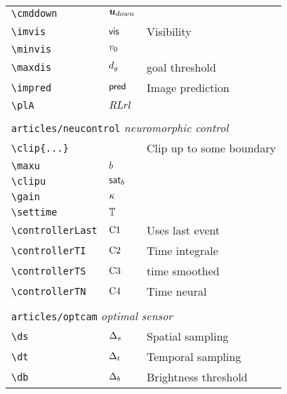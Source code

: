\begin{longtable}{lll}
 {\color[rgb]{0.5,0.5,0.5}\texttt{\textbackslash cmddown}} & $\boldsymbol{u}_{down}$ & \\ 
 {\color[rgb]{0.5,0.5,0.5}\texttt{\textbackslash imvis}} & $\mathsf{vis}$ &  Visibility\\ 
 {\color[rgb]{0.5,0.5,0.5}\texttt{\textbackslash minvis}} & $v_0$ & \\ 
 {\color[rgb]{0.5,0.5,0.5}\texttt{\textbackslash maxdis}} & $d_g$ &  goal threshold\\ 
 {\color[rgb]{0.5,0.5,0.5}\texttt{\textbackslash impred}} & $\mathsf{pred}$ &  Image prediction\\ 
 {\color[rgb]{0.5,0.5,0.5}\texttt{\textbackslash plA}} & $RLrl$ & \\ 
  &  & \\ 
 \multicolumn{3}{l}{{\color[rgb]{0.5,0.5,0.5}\texttt{articles/neucontrol}} \emph{neuromorphic control}}\\ 
 \hline
{\color[rgb]{0.5,0.5,0.5}\texttt{\textbackslash clip\{...\}}} &  &  Clip up to some boundary \\ 
 {\color[rgb]{0.5,0.5,0.5}\texttt{\textbackslash maxu}} & $b$ & \\ 
 {\color[rgb]{0.5,0.5,0.5}\texttt{\textbackslash clipu}} & $\mathsf{sat}_{b}$ & \\ 
 {\color[rgb]{0.5,0.5,0.5}\texttt{\textbackslash gain}} & $\kappa$ & \\ 
 {\color[rgb]{0.5,0.5,0.5}\texttt{\textbackslash settime}} & $\mathbb{T}$ & \\ 
 {\color[rgb]{0.5,0.5,0.5}\texttt{\textbackslash controllerLast}} & $\text{C1}$ &  Uses last event\\ 
 {\color[rgb]{0.5,0.5,0.5}\texttt{\textbackslash controllerTI}} & $\text{C2}$ &  Time integrale\\ 
 {\color[rgb]{0.5,0.5,0.5}\texttt{\textbackslash controllerTS}} & $\text{C3}$ &  time smoothed\\ 
 {\color[rgb]{0.5,0.5,0.5}\texttt{\textbackslash controllerTN}} & $\text{C4}$ &  Time neural\\ 
  &  & \\ 
 \multicolumn{3}{l}{{\color[rgb]{0.5,0.5,0.5}\texttt{articles/optcam}} \emph{optimal sensor}}\\ 
 \hline
{\color[rgb]{0.5,0.5,0.5}\texttt{\textbackslash ds}} & $\Delta_s$ &  Spatial sampling\\ 
 {\color[rgb]{0.5,0.5,0.5}\texttt{\textbackslash dt}} & $\Delta_t$ &  Temporal sampling\\ 
 {\color[rgb]{0.5,0.5,0.5}\texttt{\textbackslash db}} & $\Delta_b$ &  Brightness threshold\\ 

\end{longtable}

